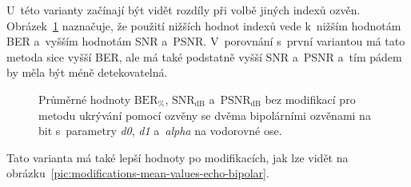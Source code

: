 U~této varianty začínají být vidět rozdíly při volbě jiných indexů ozvěn.
Obrázek~\ref{pic:no-mod-params-mean-values-echo-bipolar} naznačuje, že použití
nižších hodnot indexů vede k~nižším hodnotám BER a~vyšším hodnotám SNR a~PSNR.
V~porovnání s~první variantou má tato metoda sice vyšší BER, ale má také
podstatně vyšší SNR a~PSNR a~tím pádem by měla být méně detekovatelná.

\begin{figure}[H]
    \table
    \centering
    \caption{Průměrné hodnoty $\mathrm{BER}_{\%}$, $\mathrm{SNR}_\mathrm{dB}$
    a~$\mathrm{PSNR}_\mathrm{dB}$ bez modifikací pro metodu ukrývání pomocí
    ozvěny se dvěma bipolárními ozvěnami na bit s~parametry \textit{d0},
    \textit{d1} a~\textit{alpha} na vodorovné ose.}
    \label{pic:no-mod-params-mean-values-echo-bipolar}
\end{figure}

Tato varianta má také lepší hodnoty po modifikacích, jak lze vidět na
obrázku~\ref{pic:modifications-mean-values-echo-bipolar}.

